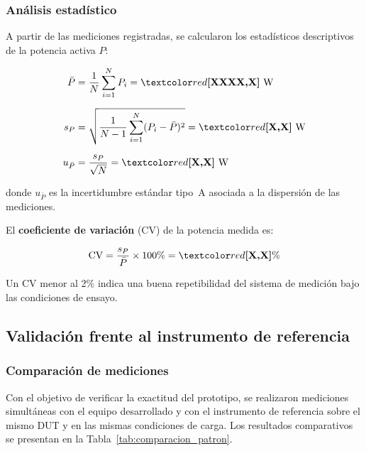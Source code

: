 \subsubsection{Análisis estadístico}

A partir de las  mediciones registradas,
se calcularon los estadísticos descriptivos de la potencia activa $P$:

\begin{align}
    \bar{P} &= \frac{1}{N}\sum_{i=1}^{N} P_i
             = \PLACEHOLDER{XXXX{,}X}~\text{W}
    \label{eq:media_potencia} \\[6pt]
    s_P &= \sqrt{\frac{1}{N-1}\sum_{i=1}^{N}(P_i - \bar{P})^2}
          = \PLACEHOLDER{X{,}X}~\text{W}
    \label{eq:std_potencia} \\[6pt]
    u_{\bar{P}} &= \frac{s_P}{\sqrt{N}}
                 = \PLACEHOLDER{X{,}X}~\text{W}
    \label{eq:incertidumbre_estadistica}
\end{align}

\noindent donde $u_{\bar{P}}$ es la incertidumbre estándar tipo~A
asociada a la dispersión de las mediciones.

El \textbf{coeficiente de variación} (CV) de la potencia medida es:

\begin{equation}
    \text{CV} = \frac{s_P}{\bar{P}} \times 100\%
              = \PLACEHOLDER{X{,}X}\%
    \label{eq:cv_potencia}
\end{equation}

Un CV menor al 2\% indica una buena repetibilidad del sistema
de medición bajo las condiciones de ensayo.

\subsection{Validación frente al instrumento de referencia}
\label{subsec:validacion_patron}

\subsubsection{Comparación de mediciones}

Con el objetivo de verificar la exactitud del prototipo,
se realizaron mediciones simultáneas con el equipo desarrollado
y con el instrumento de referencia sobre el mismo DUT y en las
mismas condiciones de carga.
Los resultados comparativos se presentan en la
Tabla~\ref{tab:comparacion_patron}.

